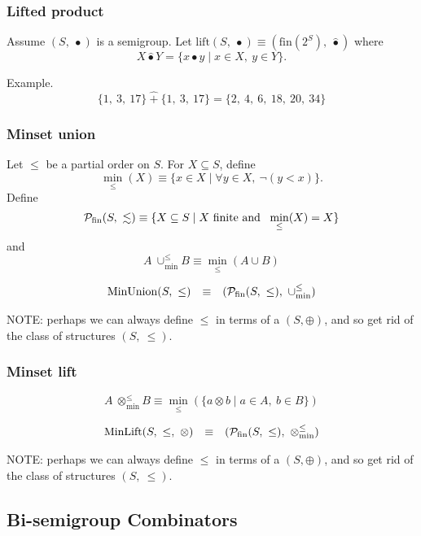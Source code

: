\documentclass[10pt]{article}
\newcommand{\minunion}{\cup_{\min}^{\leq}}
\newcommand{\minlift}{\otimes_{\min}^{\leq}}
\begin{document}
\subsubsection{Lifted product} 

Assume $(S,\ \bullet)$ is a semigroup. 
Let 
$\mathrm{lift}(S,\ \bullet) \equiv (\mathrm{fin}(2^S),\ \hat{\bullet})$ where 
\[ 
X \hat{\bullet} Y  = \{x \bullet y \mid x\in X,\ y\in Y\}. 
\]

Example. 
\[
    \{1,\ 3,\ 17\}\ \hat{+}\ \{1,\ 3,\ 17\} = \{2,\ 4,\ 6,\ 18,\ 20,\ 34\} 
\] 


\subsubsection{Minset union} 

Let $\leq$ be a partial order on $S$. 
For $X \subseteq S$, define 
\[
\min_\leq(X) \equiv \{x \in X \mid \forall y \in X,\  \neg(y < x)\}. 
\] 
Define 
\[
{\cal P}_{\mathrm{fin}}(S,\ \lesssim) 
   \equiv 
\{X \subseteq S\mid \mbox{$X$ finite and \ }\min_\leq(X) = X\} 
\] 
and 
\[
  A\ \minunion B  \equiv  \min_\leq(A\cup B) 
\] 

\[ 
\begin{array}{rcl} 
\mathrm{MinUnion}(S,\ \leq)
   & \equiv 
   & ({\cal P}_{\mathrm{fin}}(S,\ \leq),\ \minunion)
\end{array} 
\] 


NOTE: perhaps we can always define $\leq$ in terms of a $(S,\oplus)$, and so 
get rid of the class of structures $(S,\ \leq)$. 

\subsubsection{Minset lift} 

\[
  A\ \minlift B  \equiv   \min_\leq(\{a\otimes b\mid a\in A,\ b\in B\})
\] 

\[ 
\begin{array}{rcl} 
\mathrm{MinLift}(S,\ \leq,\ \otimes)
   & \equiv 
   & ({\cal P}_{\mathrm{fin}}(S,\ \leq),\ \minlift)
\end{array} 
\] 


NOTE: perhaps we can always define $\leq$ in terms of a $(S,\oplus)$, and so 
get rid of the class of structures $(S,\ \leq)$. 


\subsection{Bi-semigroup Combinators} 
\end{document}
